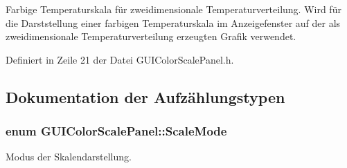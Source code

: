 Farbige Temperaturskala für zweidimensionale Temperaturverteilung. Wird für die Darststellung einer farbigen Temperaturskala im Anzeigefenster auf der als zweidimensionale Temperaturverteilung erzeugten Grafik verwendet. 

Definiert in Zeile 21 der Datei G\-U\-I\-Color\-Scale\-Panel.\-h.



\subsection{Dokumentation der Aufzählungstypen}
\hypertarget{classGUIColorScalePanel_a56a63e898188b90b82295ff7c3ebc265}{
\subsubsection[{Scale\-Mode}]{\setlength{\rightskip}{0pt plus 5cm}enum {\bf G\-U\-I\-Color\-Scale\-Panel\-::\-Scale\-Mode}}}\label{classGUIColorScalePanel_a56a63e898188b90b82295ff7c3ebc265}


Modus der Skalendarstellung. 

